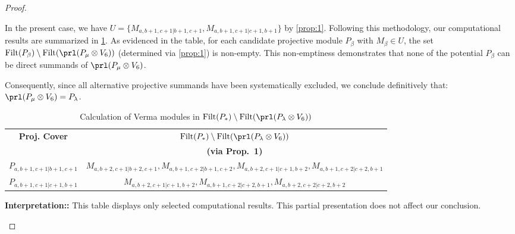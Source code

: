 \begin{proof}
\begin{enumerate}
\begin{enumerate}
In the present case, we have $U = \{M_{a,b+1,c+1|b+1,c+1},M_{a,b+1,c+1|c+1,b+1}\}$ by \cref{prop:1}.
Following this methodology, our computational results are summarized in \cref{tab:verma-analysis_1}. As evidenced in the table, for each candidate projective module $P_\beta$ with $M_\beta \in U$, the set $\operatorname{Filt}(P_\beta) \setminus \operatorname{Filt}(\prl(P_\mu \otimes V_6))$ (determined via \cref{prop:1}) is non-empty. This non-emptiness demonstrates that none of the potential $P_\beta$ can be direct summands of $\prl(P_\mu \otimes V_6)$.

Consequently, since all alternative projective summands have been systematically excluded, we conclude definitively that: $\prl(P_\mu \otimes V_6) = P_\lambda$.

\begin{table}[htbp]
\centering
\caption{Calculation of Verma modules in $\operatorname{Filt}(P_*) \setminus \operatorname{Filt}(\prl(P_\lambda \otimes V_6)) $ } \label{tab:verma-analysis_1}
\begin{tabular}{cc}
\toprule
  \textbf{Proj. Cover} & \textbf{$\operatorname{Filt}(P_*) \setminus \operatorname{Filt}(\prl(P_\lambda \otimes V_6)) $}  \\
     & \textbf{(via Prop.~1)}  \\
\midrule
  $P_{a,b+1,c+1|b+1,c+1}$ & $M_{a,b+2,c+1|b+2,c+1},M_{a,b+1,c+2|b+1,c+2},M_{a,b+2,c+1|c+1,b+2},M_{a,b+1,c+2|c+2,b+1}$  \\
  $P_{a,b+1,c+1|c+1,b+1}$ & $M_{a,b+2,c+1|c+1,b+2},M_{a,b+1,c+2|c+2,b+1},M_{a,b+2,c+2|c+2,b+2}$ \\
\bottomrule
\end{tabular}
\vspace{0.5em}
\parbox{\linewidth}{\small
\textbf{Interpretation::} 
This table displays only selected computational results. This partial presentation does not affect our conclusion.
}
\end{table}




\end{enumerate}
\end{enumerate}
\end{proof}
